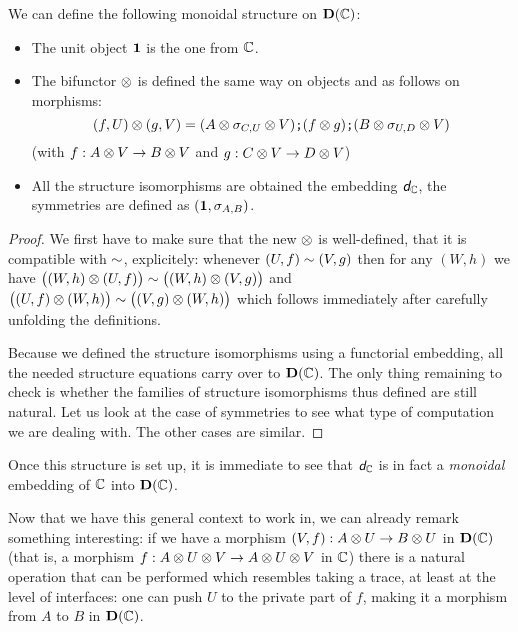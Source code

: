 \begin{proposition}
	We can define the following monoidal structure on $\mathbf D(\mathbb{C})$:
	\begin{itemize}
		\item The unit object $\mathbf 1$ is the one from $\mathbb{C}$.
		\item The bifunctor $\otimes$ is defined the same way on objects and as follows on morphisms:
		$$(f,U)\otimes(g,V)=(A\otimes \sigma_{C,U}\otimes V)\textbf{\tt;}(f\otimes g)\textbf{\tt;}(B\otimes \sigma_{U,D}\otimes V)
		$$
		(with $f:A\otimes V\rightarrow B\otimes V$ and $g:C\otimes V\rightarrow D\otimes V$)
		\item All the structure isomorphisms are obtained \via the embedding $\textit{\textsf{d}}_{\mathbb{C}}$, \eg the
		symmetries are defined as $(\mathbf 1,\sigma_{A,B})$.
	\end{itemize}
\end{proposition}

\begin{proof}
	We first have to make sure that the new $\otimes$ is well-defined, \ie that it is compatible with
	$\sim$, explicitely: whenever $(U,f)\sim(V,g)$ then for any $(W,h)$ we have 
	$\big((W,h)\otimes(U,f)\big)\sim\big((W,h)\otimes(V,g)\big)$ and 
	$\big((U,f)\otimes(W,h)\big)\sim\big((V,g)\otimes(W,h)\big)$ which follows immediately after carefully
	unfolding the definitions.

	Because we defined the structure isomorphisms using a functorial embedding, all the needed
	structure equations carry over to $\mathbf D(\mathbb{C})$. The only thing remaining to check is whether
	the families of structure isomorphisms thus defined are still natural.
	Let us look at the case of symmetries to see what type of computation we are dealing with. The
	other cases are similar.
	
\end{proof}

\begin{remark}
	Once this structure is set up, it is immediate to see that $\textit{\textsf{d}}_{\mathbb{C}}$ is in fact a \emph{monoidal}
	embedding of $\mathbb{C}$ into $\mathbf D(\mathbb{C})$.
\end{remark}


Now that we have this general context to work in, we can already remark something interesting:
if we have a morphism $(V,f):A\otimes U\rightarrow B\otimes U$ in $\mathbf D(\mathbb{C})$ (that is, a morphism
$f:A\otimes U\otimes V\rightarrow A\otimes U\otimes V$ in $\mathbb{C}$) there is a natural operation that can be
performed which resembles taking a trace, at least at the level of interfaces: one can push $U$
to the private part of $f$, making it a morphism from $A$ to $B$ in $\mathbf D(\mathbb{C})$.

